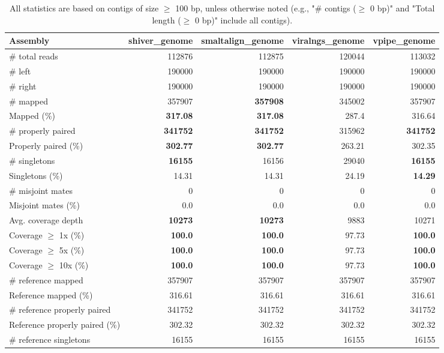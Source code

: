 \documentclass[12pt,a4paper]{article}
\begin{document}
\begin{table}[ht]
\begin{center}
\caption{All statistics are based on contigs of size $\geq$ 100 bp, unless otherwise noted (e.g., "\# contigs ($\geq$ 0 bp)" and "Total length ($\geq$ 0 bp)" include all contigs).}
\begin{tabular}{|l*{4}{|r}|}
\hline
Assembly & shiver\_genome & smaltalign\_genome & viralngs\_genome & vpipe\_genome \\ \hline
\# total reads & 112876 & 112875 & 120044 & 113032 \\ \hline
\# left & 190000 & 190000 & 190000 & 190000 \\ \hline
\# right & 190000 & 190000 & 190000 & 190000 \\ \hline
\# mapped & 357907 & {\bf 357908} & 345002 & 357907 \\ \hline
Mapped (\%) & {\bf 317.08} & {\bf 317.08} & 287.4 & 316.64 \\ \hline
\# properly paired & {\bf 341752} & {\bf 341752} & 315962 & {\bf 341752} \\ \hline
Properly paired (\%) & {\bf 302.77} & {\bf 302.77} & 263.21 & 302.35 \\ \hline
\# singletons & {\bf 16155} & 16156 & 29040 & {\bf 16155} \\ \hline
Singletons (\%) & 14.31 & 14.31 & 24.19 & {\bf 14.29} \\ \hline
\# misjoint mates & 0 & 0 & 0 & 0 \\ \hline
Misjoint mates (\%) & 0.0 & 0.0 & 0.0 & 0.0 \\ \hline
Avg. coverage depth & {\bf 10273} & {\bf 10273} & 9883 & 10271 \\ \hline
Coverage $\geq$ 1x (\%) & {\bf 100.0} & {\bf 100.0} & 97.73 & {\bf 100.0} \\ \hline
Coverage $\geq$ 5x (\%) & {\bf 100.0} & {\bf 100.0} & 97.73 & {\bf 100.0} \\ \hline
Coverage $\geq$ 10x (\%) & {\bf 100.0} & {\bf 100.0} & 97.73 & {\bf 100.0} \\ \hline
\# reference mapped & 357907 & 357907 & 357907 & 357907 \\ \hline
Reference mapped (\%) & 316.61 & 316.61 & 316.61 & 316.61 \\ \hline
\# reference properly paired & 341752 & 341752 & 341752 & 341752 \\ \hline
Reference properly paired (\%) & 302.32 & 302.32 & 302.32 & 302.32 \\ \hline
\# reference singletons & 16155 & 16155 & 16155 & 16155 \\ \hline

\end{tabular}
\end{center}
\end{table}
\end{document}
